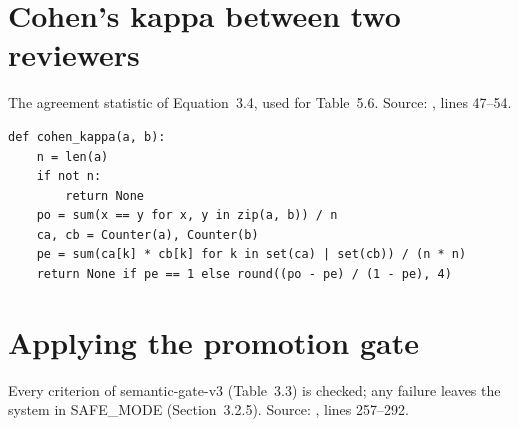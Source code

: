 \section{Cohen's kappa between two reviewers}
\label{app:A5}
The agreement statistic of Equation~3.4, used for Table~5.6. Source: , lines 47--54.

\begin{lstlisting}[style=repo, firstnumber=47]
def cohen_kappa(a, b):
    n = len(a)
    if not n:
        return None
    po = sum(x == y for x, y in zip(a, b)) / n
    ca, cb = Counter(a), Counter(b)
    pe = sum(ca[k] * cb[k] for k in set(ca) | set(cb)) / (n * n)
    return None if pe == 1 else round((po - pe) / (1 - pe), 4)
\end{lstlisting}

\section{Applying the promotion gate}
\label{app:A6}
Every criterion of semantic-gate-v3 (Table~3.3) is checked; any failure leaves the system in SAFE\_MODE (Section~3.2.5). Source: , lines 257--292.

